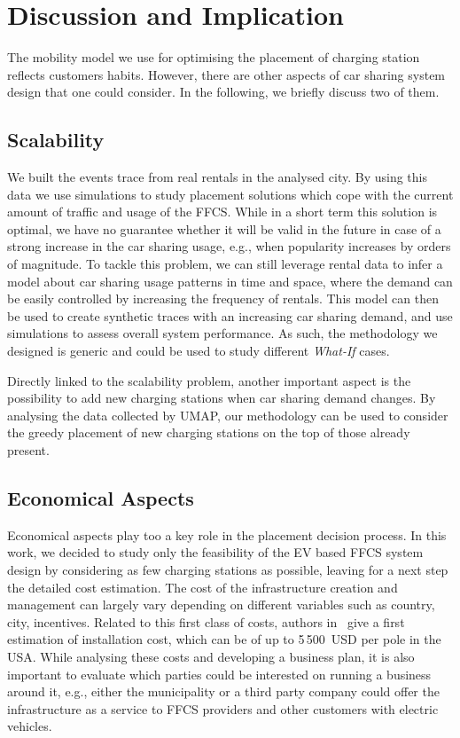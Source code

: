 \section{Discussion and Implication}
\label{sec:7_8_discussion}

The mobility model we use for optimising the placement of charging station reflects customers habits. However, there are other aspects of car sharing system design that one could consider. In the following, we briefly discuss two of them.

\subsection{\textbf{Scalability}}

We built the events trace from real rentals in the analysed city. By using this data we use simulations to study placement solutions which cope with the current amount of traffic and usage of the FFCS. While in a short term this solution is optimal, we have no guarantee whether it will be valid in the future in case of a strong increase in the car sharing usage, e.g., when popularity increases by orders of magnitude. To tackle this problem, we can still leverage rental data to infer a model about car sharing usage patterns in time and space, where the demand can be easily controlled by increasing the frequency of rentals. This model can then be used to create synthetic traces with an increasing car sharing demand, and use simulations to assess overall system performance. As such, the methodology we designed is generic and could be used to study different \textit{What-If} cases.

Directly linked to the scalability problem, another important aspect is the possibility to add new charging stations when car sharing demand changes. 
By analysing the data collected by UMAP, our methodology can be used to consider the greedy placement of new charging stations on the top of those already present.

\subsection{\textbf{Economical Aspects}}


Economical aspects play too a key role in the placement decision process. In this work, we decided to study only the feasibility of the EV based FFCS system design by considering as few charging stations as possible, leaving for a next step the detailed cost estimation. The cost of the infrastructure creation and management can largely vary depending on different variables such as country, city, incentives. 
Related to this first class of costs, authors in~\cite{USAInstallCost} give a first estimation of installation cost, which can be of up to 5\,500~USD per pole in the USA. 
While analysing these costs and developing a business plan, it is also important to evaluate which parties could be interested on running a business around it, e.g., either the municipality or a third party company could offer the infrastructure as a service to FFCS providers and other customers with electric vehicles.  

